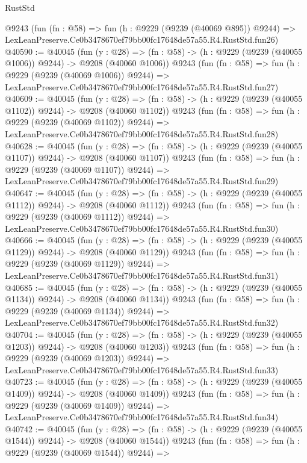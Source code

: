 \begin{lexlean}{RustStd}
\begin{coremodule}
    @9243
    (fun (fn : @58) =>
    fun (h : @9229 (@9239 (@40069 @895)) @9244) =>
    LexLeanPreserve.Ce0b3478670ef79bb00fc17648de57a55.R4.RustStd.fun26)
@40590 := @40045
    (fun (y : @28) =>
    (fn : @58) -> (h : @9229 (@9239 (@40055 @1006)) @9244) -> @9208 (@40060 @1006))
    @9243
    (fun (fn : @58) =>
    fun (h : @9229 (@9239 (@40069 @1006)) @9244) =>
    LexLeanPreserve.Ce0b3478670ef79bb00fc17648de57a55.R4.RustStd.fun27)
@40609 := @40045
    (fun (y : @28) =>
    (fn : @58) -> (h : @9229 (@9239 (@40055 @1102)) @9244) -> @9208 (@40060 @1102))
    @9243
    (fun (fn : @58) =>
    fun (h : @9229 (@9239 (@40069 @1102)) @9244) =>
    LexLeanPreserve.Ce0b3478670ef79bb00fc17648de57a55.R4.RustStd.fun28)
@40628 := @40045
    (fun (y : @28) =>
    (fn : @58) -> (h : @9229 (@9239 (@40055 @1107)) @9244) -> @9208 (@40060 @1107))
    @9243
    (fun (fn : @58) =>
    fun (h : @9229 (@9239 (@40069 @1107)) @9244) =>
    LexLeanPreserve.Ce0b3478670ef79bb00fc17648de57a55.R4.RustStd.fun29)
@40647 := @40045
    (fun (y : @28) =>
    (fn : @58) -> (h : @9229 (@9239 (@40055 @1112)) @9244) -> @9208 (@40060 @1112))
    @9243
    (fun (fn : @58) =>
    fun (h : @9229 (@9239 (@40069 @1112)) @9244) =>
    LexLeanPreserve.Ce0b3478670ef79bb00fc17648de57a55.R4.RustStd.fun30)
@40666 := @40045
    (fun (y : @28) =>
    (fn : @58) -> (h : @9229 (@9239 (@40055 @1129)) @9244) -> @9208 (@40060 @1129))
    @9243
    (fun (fn : @58) =>
    fun (h : @9229 (@9239 (@40069 @1129)) @9244) =>
    LexLeanPreserve.Ce0b3478670ef79bb00fc17648de57a55.R4.RustStd.fun31)
@40685 := @40045
    (fun (y : @28) =>
    (fn : @58) -> (h : @9229 (@9239 (@40055 @1134)) @9244) -> @9208 (@40060 @1134))
    @9243
    (fun (fn : @58) =>
    fun (h : @9229 (@9239 (@40069 @1134)) @9244) =>
    LexLeanPreserve.Ce0b3478670ef79bb00fc17648de57a55.R4.RustStd.fun32)
@40704 := @40045
    (fun (y : @28) =>
    (fn : @58) -> (h : @9229 (@9239 (@40055 @1203)) @9244) -> @9208 (@40060 @1203))
    @9243
    (fun (fn : @58) =>
    fun (h : @9229 (@9239 (@40069 @1203)) @9244) =>
    LexLeanPreserve.Ce0b3478670ef79bb00fc17648de57a55.R4.RustStd.fun33)
@40723 := @40045
    (fun (y : @28) =>
    (fn : @58) -> (h : @9229 (@9239 (@40055 @1409)) @9244) -> @9208 (@40060 @1409))
    @9243
    (fun (fn : @58) =>
    fun (h : @9229 (@9239 (@40069 @1409)) @9244) =>
    LexLeanPreserve.Ce0b3478670ef79bb00fc17648de57a55.R4.RustStd.fun34)
@40742 := @40045
    (fun (y : @28) =>
    (fn : @58) -> (h : @9229 (@9239 (@40055 @1544)) @9244) -> @9208 (@40060 @1544))
    @9243
    (fun (fn : @58) =>
    fun (h : @9229 (@9239 (@40069 @1544)) @9244) =>

\end{coremodule}
\end{lexlean}
